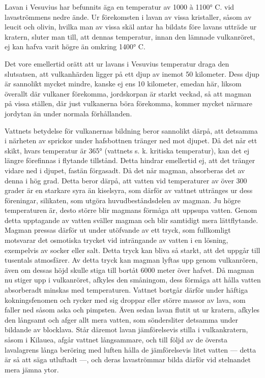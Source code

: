\documentclass[a4paper, 12pt, oneside, swedish]{article}
\begin{document}
Lavan i Vesuvius har befunnits äga en temperatur av 1000 à 1100° C. vid lavaströmmens nedre ände. Ur förekomsten i lavan av vissa kristaller, såsom av leucit och olivin, hvilka man av vissa skäl antar ha bildats före lavans utträde ur kratern, sluter man till, att dennas temperatur, innan den lämnade vulkanröret, ej kan hafva varit högre än omkring 1400° C.

Det vore emellertid orätt att ur lavans i Vesuvius temperatur draga den slutsatsen, att vulkanhärden ligger på ett djup av inemot 50 kilometer. Dess djup är sannolikt mycket mindre, kanske ej ens 10 kilometer, emedan här, liksom överallt där vulkaner förekomma, jordskorpan är starkt veckad, så att magman på vissa ställen, där just vulkanerna böra förekomma, kommer mycket närmare jordytan än under normala förhållanden.

Vattnets betydelse för vulkanernas bildning beror sannolikt därpå, att detsamma i närheten av sprickor under hafsbottnen tränger ned mot djupet. Då det når ett skikt, hvars temperatur är 365° (vattnets s. k. kritiska temperatur), kan det ej längre förefinnas i flytande tillstånd. Detta hindrar emellertid ej, att det tränger vidare ned i djupet, fastän förgasadt. Då det når magman, absorberas det av denna i hög grad. Detta beror därpå, att vatten vid temperaturer av över 300 grader är en starkare syra än kiselsyra, som därför av vattnet uttränges ur dess föreningar, silikaten, som utgöra huvudbeståndsdelen av magman. Ju högre temperaturen är, desto större blir magmans förmåga att uppsupa vatten. Genom detta upptagande av vatten sväller magman och blir samtidigt mera lättflytande. Magman pressas därför ut under utöfvande av ett tryck, som fullkomligt motsvarar det osmotiska trycket vid inträngande av vatten i en lösning, exempelvis av socker eller salt. Detta tryck kan bliva så starkt, att det uppgår till tusentals atmosfärer. Av detta tryck kan magman lyftas upp genom vulkanrören, även om dessas höjd skulle stiga till bortåt 6000 meter över hafvet. Då magman nu stiger upp i vulkanröret, afkyles den småningom, dess förmåga att hålla vatten absorberadt minskas med temperaturen. Vattnet bortgår därför under häftiga kokningsfenomen och rycker med sig droppar eller större massor av lava, som faller ned såsom aska och pimpsten. Även sedan lavan flutit ut ur kratern, afkyles den långsamt och afger allt mera vatten, som söndersliter detsamma under bildande av blocklava. Står däremot lavan jämförelsevis stilla i vulkankratern, såsom i Kilauea, afgår vattnet långsammare, och till följd av de översta lavalagrens långa beröring med luften hålla de jämförelsevis litet vatten --- detta är så att säga utluftadt ---, och deras lavaströmmar bilda därför vid stelnandet mera jämna ytor.
\end{document}
